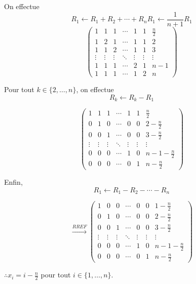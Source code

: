 \documentclass[12pt, a4paper]{article}
\begin{document}
\begin{enumerate}[label=3.\arabic*., start=25]
    On effectue
    \[
    R_1 \leftarrow R_1 + R_2 + \cdots + R_n
        R_1 \leftarrow \frac{1}{n+1}R_1
    \]
    \[
    \left(
    \begin{array}{cccccc|c}
    1 & 1 & 1 & \cdots & 1 & 1 & \frac{n}{2}\\
    1 & 2 & 1 & \cdots & 1 & 1 & 2\\
    1 & 1 & 2 & \cdots & 1 & 1 & 3\\
    \vdots & \vdots & \vdots & \ddots & \vdots & \vdots & \vdots\\
    1 & 1 & 1 & \cdots & 2 & 1 & n-1\\
    1 & 1 & 1 & \cdots & 1 & 2 & n
    \end{array}
    \right)
    \]

    Pour tout $k \in \{2,\ldots,n\}$, on effectue
    \[
    R_k \leftarrow R_k - R_1
    \]

    \[
    \left(
    \begin{array}{cccccc|c}
    1 & 1 & 1 & \cdots & 1 & 1 & \frac{n}{2}\\
    0 & 1 & 0 & \cdots & 0 & 0 & 2-\frac{n}{2}\\
    0 & 0 & 1 & \cdots & 0 & 0 & 3-\frac{n}{2}\\
    \vdots & \vdots & \vdots & \ddots & \vdots & \vdots & \vdots\\
    0 & 0 & 0 & \cdots & 1 & 0 & n-1-\frac{n}{2}\\
    0 & 0 & 0 & \cdots & 0 & 1 & n-\frac{n}{2}
    \end{array}
    \right)
    \]

    Enfin,
    \[
    R_1 \leftarrow R_1 - R_2 - \cdots - R_n
    \]

    \[
    \xrightarrow{RREF}
    \left(
    \begin{array}{cccccc|c}
    1 & 0 & 0 & \cdots & 0 & 0 & 1-\frac{n}{2}\\
    0 & 1 & 0 & \cdots & 0 & 0 & 2-\frac{n}{2}\\
    0 & 0 & 1 & \cdots & 0 & 0 & 3-\frac{n}{2}\\
    \vdots & \vdots & \vdots & \ddots & \vdots & \vdots & \vdots\\
    0 & 0 & 0 & \cdots & 1 & 0 & n-1-\frac{n}{2}\\
    0 & 0 & 0 & \cdots & 0 & 1 & n-\frac{n}{2}
    \end{array}
    \right)
    \]

    $\therefore x_i = i-\frac{n}{2}$ pour tout $i \in \{1,\ldots,n\}$.

    \pagebreak


\end{enumerate}
\end{document}
